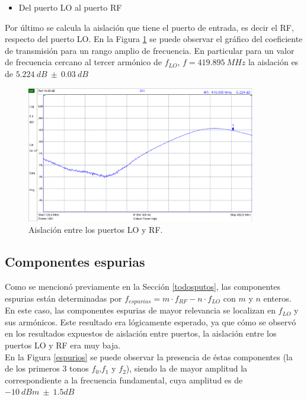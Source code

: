 \documentclass[a4paper,10pt]{article}
\begin{document}
	\begin{itemize}
		\item Del puerto LO al puerto RF
	\end{itemize}
	
	\indent Por \'ultimo se calcula la aislaci\'on que tiene el puerto de 
	entrada, es decir el RF, respecto del puerto LO. En la Figura 
	\ref{isolation3} se puede observar el gr\'afico del coeficiente de 
	transmisi\'on para un rango amplio de frecuencia. En particular para un 
	valor de frecuencia cercano al tercer arm\'onico de 
	$f_{LO}$, $f=419.895~MHz$ la aislaci\'on es de $5.224~dB~\pm~0.03~dB$
	
	\begin{figure}[!htb]
		\centering
		\includegraphics[width=10cm]{Images/aislacion3.png}
		\caption{Aislaci\'on entre los puertos LO y RF.}
		\label{isolation3}
	\end{figure}	
	
	\subsection{Componentes espurias}
	\indent Como se mencion\'o previamente en la Secci\'on \ref{todosputos}, las
	componentes espurias est\'an determinadas por 
	$f_{espurias}=m\cdot f_{RF}-n\cdot f_{LO}$ con $m$ y $n$ enteros. En este 
	caso, las componentes espurias de mayor relevancia se localizan en $f_{LO}$ 
	y sus arm\'onicos. Este resultado era l\'ogicamente esperado, ya que c\'omo 
	se observ\'o en los resultados expuestos de aislaci\'on entre puertos, la 
	aislaci\'on entre los puertos LO y RF era muy baja. \\
	\indent En la Figura \ref{espurios} se puede observar la presencia de 
	\'estas componentes (la de los primeros 3 tonos $f_0$,$f_1$ y $f_2$), siendo
	la de mayor amplitud la correspondiente a la frecuencia fundamental, cuya 
	amplitud es de $-10~dBm~\pm~1.5dB$
	
\end{document}
